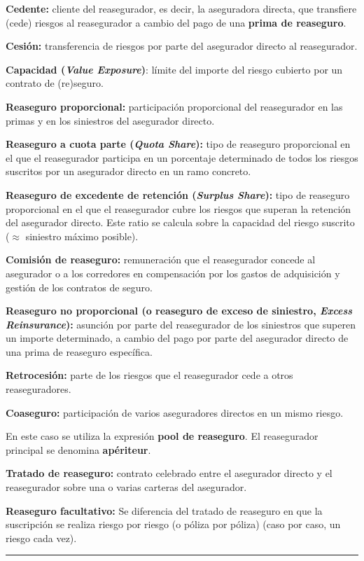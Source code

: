 
\begin{f}
	
	\textbf{Cedente:} cliente del reasegurador, es decir, la aseguradora directa, que transfiere (cede) riesgos al reasegurador a cambio del pago
	de una \textbf{prima de reaseguro}.
	
	\textbf{Cesión:} transferencia de riesgos por parte del asegurador directo al reasegurador.
	
	\textbf{Capacidad (\emph{Value Exposure})}: límite del importe del riesgo cubierto por un contrato de (re)seguro.
	
	\textbf{Reaseguro proporcional:} participación proporcional del reasegurador en las primas y en los siniestros del asegurador directo.
	
	\textbf{Reaseguro a cuota parte (\emph{Quota Share}):} tipo de reaseguro proporcional en el que el  reasegurador participa en un porcentaje determinado de todos los riesgos suscritos por un asegurador directo en un ramo concreto.
	
	\textbf{Reaseguro de excedente de retención (\emph{Surplus Share}):} tipo de reaseguro proporcional en el que el reasegurador cubre los riesgos que superan la retención
	del asegurador directo. Este ratio se calcula sobre la capacidad del riesgo suscrito (\(\approx\) siniestro máximo posible).
	
	\textbf{Comisión de reaseguro:} remuneración que el reasegurador concede al asegurador o a los corredores en compensación por los gastos de adquisición y gestión de los contratos de seguro.
	
	\textbf{Reaseguro no proporcional (o reaseguro de exceso de siniestro, \emph{Excess Reinsurance}):}
	asunción por parte del reasegurador de los siniestros que superen un importe determinado, a cambio del pago por parte del asegurador directo de una prima de reaseguro específica.
	
	\textbf{Retrocesión:}  parte de los riesgos que el reasegurador cede a otros reaseguradores.
	
	\textbf{Coaseguro:} participación de varios aseguradores directos en un mismo riesgo.
	
	En este caso se utiliza la expresión \textbf{pool de reaseguro}. 
	El reasegurador principal se denomina \textbf{apériteur}. 
	
	\textbf{Tratado de reaseguro:} contrato celebrado entre el asegurador directo y el reasegurador sobre una o varias carteras del asegurador.
	
	\textbf{Reaseguro facultativo:}
	Se diferencia del tratado de reaseguro en que la suscripción se realiza riesgo por riesgo (o póliza por póliza) (caso por caso, un riesgo cada vez). 
	
\end{f}
\hrule




